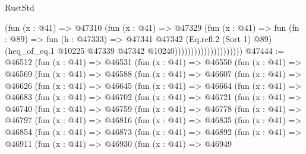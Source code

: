 \begin{lexlean}{RustStd}
\begin{coremodule}
                                      (fun (x : @41) =>
                                      @47310
                                        (fun (x : @41) =>
                                        @47329
                                          (fun (x : @41) =>
                                          fun (fn : @89) =>
                                          fun (h : @47333) =>
                                          @47341
                                            @47342
                                            (Eq.refl.{2} (Sort 1) @89)
                                            (heq_of_eq.{1}
                                              @10225
                                              @47339
                                              @47342
                                              @10240)))))))))))))))))))))
@47444 := @46512
    (fun (x : @41) =>
    @46531
      (fun (x : @41) =>
      @46550
        (fun (x : @41) =>
        @46569
          (fun (x : @41) =>
          @46588
            (fun (x : @41) =>
            @46607
              (fun (x : @41) =>
              @46626
                (fun (x : @41) =>
                @46645
                  (fun (x : @41) =>
                  @46664
                    (fun (x : @41) =>
                    @46683
                      (fun (x : @41) =>
                      @46702
                        (fun (x : @41) =>
                        @46721
                          (fun (x : @41) =>
                          @46740
                            (fun (x : @41) =>
                            @46759
                              (fun (x : @41) =>
                              @46778
                                (fun (x : @41) =>
                                @46797
                                  (fun (x : @41) =>
                                  @46816
                                    (fun (x : @41) =>
                                    @46835
                                      (fun (x : @41) =>
                                      @46854
                                        (fun (x : @41) =>
                                        @46873
                                          (fun (x : @41) =>
                                          @46892
                                            (fun (x : @41) =>
                                            @46911
                                              (fun (x : @41) =>
                                              @46930
                                                (fun (x : @41) =>
                                                @46949

\end{coremodule}
\end{lexlean}
